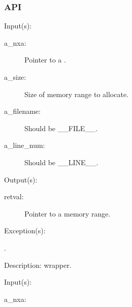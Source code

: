 \subsubsection{API}
\begin{capi}
\label{nxa_malloc_e}
\label{nxa_malloc}
	\begin{capilist}
	\item[Input(s): ]
		\begin{description}\item[]
		\item[a\_nxa: ]
			Pointer to a .
		\item[a\_size: ]
			Size of memory range to allocate.
		\item[a\_filename: ]
			Should be \_\_FILE\_\_.
		\item[a\_line\_num: ]
			Should be \_\_LINE\_\_.
		\end{description}
	\item[Output(s): ]
		\begin{description}\item[]
		\item[retval: ]
			Pointer to a memory range.
		\end{description}
	\item[Exception(s): ]
		\begin{description}\item[]
		\item[.]
		\end{description}
	\item[Description: ]
		 wrapper.
	\end{capilist}
\label{nxa_realloc_e}
\label{nxa_realloc}
	\begin{capilist}
	\item[Input(s): ]
		\begin{description}\item[]
		\item[a\_nxa: ]

\end{description}
\end{capilist}
\end{capi}
